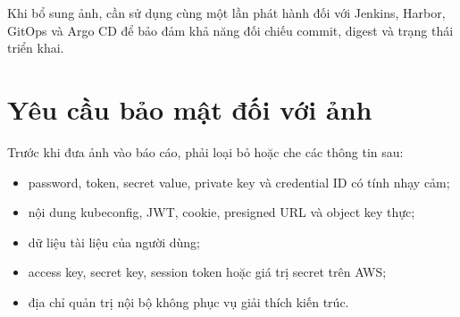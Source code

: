 Khi bổ sung ảnh, cần sử dụng cùng một lần phát hành đối với Jenkins, Harbor, GitOps và Argo CD để bảo đảm khả năng đối chiếu commit, digest và trạng thái triển khai.

\section{Yêu cầu bảo mật đối với ảnh}

Trước khi đưa ảnh vào báo cáo, phải loại bỏ hoặc che các thông tin sau:

\begin{itemize}
  \item password, token, secret value, private key và credential ID có tính nhạy cảm;
  \item nội dung kubeconfig, JWT, cookie, presigned URL và object key thực;
  \item dữ liệu tài liệu của người dùng;
  \item access key, secret key, session token hoặc giá trị secret trên AWS;
  \item địa chỉ quản trị nội bộ không phục vụ giải thích kiến trúc.
\end{itemize}
